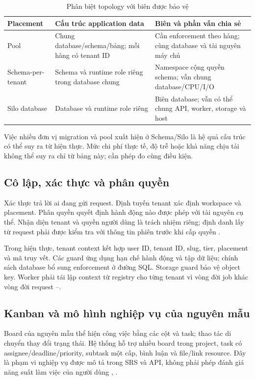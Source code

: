\begin{table}[htbp]
\centering\caption{Phân biệt topology với biên được bảo vệ}\label{tab:topologies}
\begin{tabularx}{\textwidth}{P{.20\textwidth}XX}
\toprule Placement & Cấu trúc application data & Biên và phần vẫn chia sẻ \\
\midrule
Pool & Chung database\slash schema\slash bảng; mỗi hàng có tenant ID & Cần enforcement theo hàng; cùng database và tài nguyên máy chủ \\
Schema-per-tenant & Schema và runtime role riêng trong database chung & Namespace cộng quyền schema; vẫn chung database\slash CPU\slash I\slash O \\
Silo database & Database và runtime role riêng & Biên database; vẫn có thể chung API, worker, storage và host \\
\bottomrule\end{tabularx}
\end{table}
Việc nhiều đơn vị migration và pool xuất hiện ở Schema\slash Silo là hệ quả cấu trúc có thể suy ra từ hiện thực. Mức chi phí thực tế, độ trễ hoặc khả năng chịu tải không thể suy ra chỉ từ bảng này; cần phép đo cùng điều kiện.

\subsection{Cô lập, xác thực và phân quyền}
Xác thực trả lời ai đang gửi request. Định tuyến tenant xác định workspace và placement. Phân quyền quyết định hành động nào được phép với tài nguyên cụ thể. Nhận diện tenant và quyền người dùng là trách nhiệm riêng; định danh lấy từ request phải được kiểm tra với thông tin phiên trước khi cấp quyền \citep{azureTenantMapping}.

Trong hiện thực, tenant context kết hợp user ID, tenant ID, slug, tier, placement và mã truy vết. Các guard ứng dụng hạn chế hành động và tập dữ liệu; chính sách database bổ sung enforcement ở đường SQL. Storage guard bảo vệ object key. Worker phải tái lập context từ registry cho từng tenant vì vòng đời job khác vòng đời request --.

\subsection{Kanban và mô hình nghiệp vụ của nguyên mẫu}
Board của nguyên mẫu thể hiện công việc bằng các cột và task; thao tác di chuyển thay đổi trạng thái. Hệ thống hỗ trợ nhiều board trong project, task có assignee\slash deadline\slash priority, subtask một cấp, bình luận và file\slash link resource. Đây là phạm vi nghiệp vụ được mô tả trong SRS và API, không phải phép đánh giá năng suất làm việc của người dùng , .

